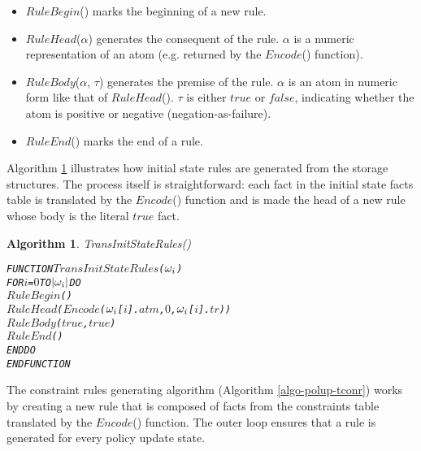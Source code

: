 \documentclass[11pt]{report}
\newenvironment{vverbatim}
{
  \begin{alltt}
}
{
    \vspace{-\baselineskip}
  \end{alltt}
}
\newtheorem{vvalgorithm}{Algorithm}[chapter]
\newenvironment{valgorithm}[2]
{
  \begin{vvalgorithm}{#1}
    \label{#2}
    \small
    \begin{vverbatim}
}
{
    \end{vverbatim}
  \end{vvalgorithm}
}
\begin{document}
          \begin{itemize}
            \item
              $RuleBegin$() marks the beginning of a new rule.
            \item
              $RuleHead$($\alpha$) generates the consequent of the rule.
              $\alpha$ is a numeric representation of an atom (e.g. returned by
              the $Encode$() function).
            \item
              $RuleBody$($\alpha$, $\tau$) generates the premise of the rule.
              $\alpha$ is an atom in numeric form like that of $RuleHead$().
              $\tau$ is either $true$ or $false$, indicating whether the atom
              is positive or negative (negation-as-failure).
            \item
              $RuleEnd$() marks the end of a rule.
          \end{itemize}

          Algorithm \ref{algo-polup-tisr} illustrates how initial state rules
          are generated from the storage structures. The process itself is
          straightforward: each fact in the initial state facts table is
          translated by the $Encode$() function and is made the head of a new
          rule whose body is the literal $true$ fact.

          \begin{valgorithm}{TransInitStateRules()}{algo-polup-tisr}
FUNCTION \(TransInitStateRules\)(\(\omega\sb{i}\))
  FOR \(i\) = \(0\) TO \(|\omega\sb{i}|\) DO
    \(RuleBegin\)()
    \(RuleHead\)(\(Encode\)(\(\omega\sb{i}\)[\(i\)].\(atm\), \(0\), \(\omega\sb{i}\)[\(i\)].\(tr\)))
    \(RuleBody\)(\(true\), \(true\))
    \(RuleEnd\)()
  ENDDO
ENDFUNCTION
          \end{valgorithm}

          The constraint rules generating algorithm (Algorithm
          \ref{algo-polup-tconr}) works by creating a new rule that is
          composed of facts from the constraints table translated by the
          $Encode$() function. The outer loop ensures that a rule is
          generated for every policy update state.
\end{document}
